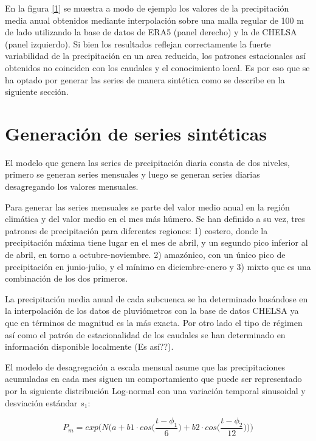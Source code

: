  En la figura \ref{1} se muestra a modo de ejemplo los  valores de la precipitación media anual  obtenidos mediante interpolación 
 sobre una malla regular de 100 m de lado utilizando la base de datos de ERA5 (panel derecho) y la de CHELSA (panel izquierdo).
 Si bien los resultados reflejan correctamente la fuerte variabilidad de la precipitación en un area reducida, los patrones estacionales
 así obtenidos no coinciden con los caudales y el conocimiento local. Es por eso que se ha optado por generar las series 
 de manera sintética como se describe en la siguiente sección.




\section{Generación de series sintéticas}
El modelo que genera las series de precipitación diaria consta de dos niveles, primero se generan series mensuales y
luego se generan series diarias desagregando los valores mensuales.

Para generar las series mensuales se parte del valor medio anual en la región climática y del valor medio en el 
mes más húmero.
Se han definido a su vez, tres patrones de precipitación para diferentes regiones:
1) costero, donde la precipitación máxima tiene lugar en el mes de abril, y un segundo pico inferior al de abril, en torno a octubre-noviembre.
2) amazónico, con un único pico de precipitación en junio-julio, y el mínimo en diciembre-enero y 3) mixto que es una combinación de los dos primeros. 


La precipitación media anual de cada subcuenca  se ha determinado basándose en la interpolación de los datos de 
pluviómetros con la base de datos CHELSA ya que en términos de magnitud es la más exacta.
Por otro lado el tipo de régimen así como el patrón de estacionalidad de los caudales se han determinado en información disponible
localmente  (\textcolor{codegreen}{Es así??}).

El modelo de desagregación a escala mensual asume que las precipitaciones acumuladas en cada mes siguen un comportamiento
que puede ser representado por la siguiente distribución Log-normal con una variación temporal sinusoidal y
desviación estándar $s_1$:

\begin{equation}
    P_m=exp\Bigg(N\bigg(a+b1\cdot cos\bigg(\frac{t-\phi_1}{6}\bigg)+b2\cdot cos\bigg(\frac{t-\phi_2}{12}\bigg)\bigg)\Bigg)
\end{equation}

